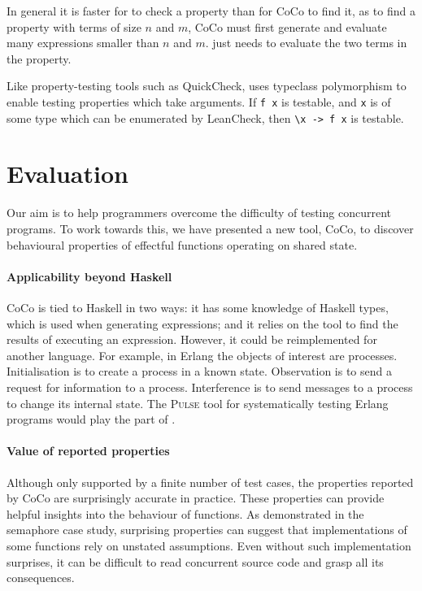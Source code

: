 In general it is faster for \dejafu{} to check a property than for
CoCo to find it, as to find a property with terms of size $n$ and $m$,
CoCo must first generate and evaluate many expressions smaller than
$n$ and $m$.  \dejafu{} just needs to evaluate the two terms in the
property.

Like property-testing tools such as QuickCheck\cite{claessen2000},
\dejafu{} uses typeclass polymorphism to enable testing properties
which take arguments.  If \texttt{f x} is testable, and \texttt{x} is
of some type which can be enumerated by LeanCheck\cite{leancheck},
then \verb|\x -> f x| is testable.

\section{Evaluation}
\label{sec:coco-conclusions}

Our aim is to help programmers overcome the difficulty of testing
concurrent programs.  To work towards this, we have presented a new
tool, CoCo, to discover behavioural properties of effectful functions
operating on shared state.

\paragraph{Applicability beyond Haskell}
CoCo is tied to Haskell in two ways: it has some knowledge of Haskell
types, which is used when generating expressions; and it relies on the
\dejafu{} tool to find the results of executing an expression.
However, it could be reimplemented for another language.  For example,
in Erlang the objects of interest are processes.  Initialisation is to
create a process in a known state.  Observation is to send a request
for information to a process.  Interference is to send messages to a
process to change its internal state.  The \textsc{Pulse} tool for
systematically testing Erlang programs\cite{claessen2009} would play
the part of \dejafu{}.

\paragraph{Value of reported properties}
Although only supported by a finite number of test cases, the
properties reported by CoCo are surprisingly accurate in practice.
These properties can provide helpful insights into the behaviour of
functions.  As demonstrated in the semaphore case study, surprising
properties can suggest that implementations of some functions rely on
unstated assumptions.  Even without such implementation surprises, it
can be difficult to read concurrent source code and grasp all its
consequences.

